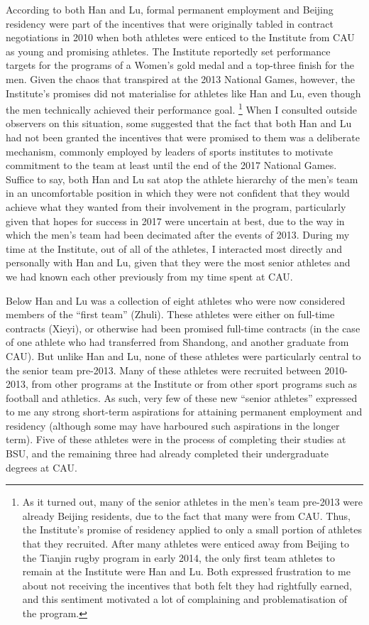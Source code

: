   According to both Han and Lu, formal permanent employment and Beijing residency were part of the incentives that were originally tabled in contract negotiations in 2010 when both athletes were enticed to the Institute from CAU as young and promising athletes.  The Institute reportedly set performance targets for the programs of a Women's gold medal and a top-three finish for the men.  Given the chaos that transpired at the 2013 National Games, however, the Institute's promises did not materialise for athletes like Han and Lu, even though the men technically achieved their performance goal.
      \footnote{As it turned out, many of the senior athletes in the men's team pre-2013 were already Beijing residents, due to the fact that many were from CAU.  Thus, the Institute's promise of residency applied to only a small portion of athletes that they recruited.  After many athletes were enticed away from Beijing to the Tianjin rugby program in early 2014, the only first team athletes to remain at the Institute were Han and Lu.  Both expressed frustration to me about not receiving the incentives that both felt they had rightfully earned, and this sentiment motivated a lot of complaining and problematisation of the program.}
  When I consulted outside observers on this situation, some suggested that the fact that both Han and Lu had not been granted the incentives that were promised to them was a deliberate mechanism, commonly employed by leaders of sports institutes to motivate commitment to the team at least until the end of the 2017 National Games.  Suffice to say, both Han and Lu sat atop the athlete hierarchy of the men's team in an uncomfortable position in which they were not confident that they would achieve what they wanted from their involvement in the program, particularly given that hopes for success in 2017 were uncertain at best, due to the way in which the men's team had been decimated after the events of 2013. During my time at the Institute, out of all of the athletes, I interacted most directly and personally with Han and Lu, given that they were the most senior athletes and we had known each other previously from my time spent at CAU.


  Below Han and Lu was a collection of eight athletes who were now considered members of the ``first team'' (Zhuli).   These athletes were either on full-time contracts (Xieyi), or otherwise had been promised full-time contracts (in the case of one athlete who had transferred from Shandong, and another graduate from CAU). But unlike Han and Lu, none of these athletes were particularly central to the senior team pre-2013.  Many of these athletes were recruited between 2010-2013, from other programs at the Institute or from other sport programs such as football and athletics.  As such, very few of these new ``senior athletes'' expressed to me any strong short-term aspirations for attaining permanent employment and residency (although some may have harboured such aspirations in the longer term). Five of these athletes were in the process of completing their studies at BSU, and the remaining three had already completed their undergraduate degrees at CAU.

